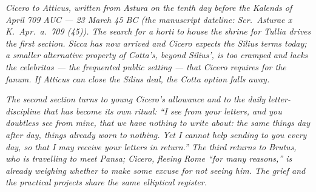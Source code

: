 
\textit{Cicero to Atticus, written from Astura on the
tenth day before the Kalends of April 709 AUC ---
23 March 45 BC (the manuscript dateline: \textit{Scr.\
Asturae x K.\ Apr.\ a.\ 709 (45)}). The search for a
\textit{horti} to house the shrine for Tullia drives
the first section. Sicca has now arrived and Cicero
expects the Silius terms today; a smaller alternative
property of Cotta's, beyond Silius', is too cramped
and lacks the \textit{celebritas} --- the frequented
public setting --- that Cicero requires for the
\textit{fanum}. If Atticus can close the Silius deal,
the Cotta option falls away.}

\textit{The second section turns to young Cicero's
allowance and to the daily letter-discipline that has
become its own ritual: ``I see from your letters, and
you doubtless see from mine, that we have nothing to
write about: the same things day after day, things
already worn to nothing. Yet I cannot help sending to
you every day, so that I may receive your letters in
return.'' The third returns to Brutus, who is
travelling to meet Pansa; Cicero, fleeing Rome ``for
many reasons,'' is already weighing whether to make
some excuse for not seeing him. The grief and the
practical projects share the same elliptical
register.}
